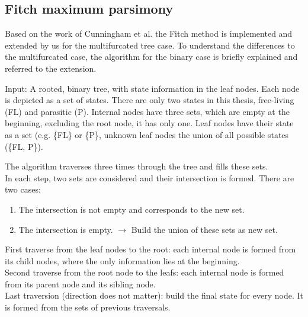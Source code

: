    \subsection{Fitch maximum parsimony}
      Based on the work of Cunningham et al. \cite{Cunningham1998} the Fitch method \cite{Fitch1971} 
        is implemented and extended by us for the multifurcated tree case. To understand the 
        differences to the multifurcated case, the algorithm for the binary case is briefly explained 
        and referred to the extension.

      Input: A rooted, binary tree, with state information in the leaf nodes. Each node is depicted as 
        a set of states. There are only two states in this thesis, free-living (FL) and parasitic (P). 
        Internal nodes have three sets, which are empty at the beginning, excluding the root node, it 
        has only one. Leaf nodes have their state as a set (e.g. \{FL\} or \{P\}, unknown leaf nodes the 
        union of all possible states (\{FL, P\}).

      The algorithm traverses three times through the tree and fills these sets. \\
      In each step, two sets are considered and their intersection is formed. There are two cases:
      \begin{enumerate}
        \item The intersection is not empty and corresponds to the new set.
        \item The intersection is empty. $\rightarrow$ Build the union of these sets as new set.
      \end{enumerate}
      First traverse from the leaf nodes to the root: each internal node is formed from its child nodes, 
        where the only information lies at the beginning. \\
      Second traverse from the root node to the leafs: each internal node is formed from its parent node 
        and its sibling node. \\
      Last traversion (direction does not matter): build the final state for every node. It is formed 
        from the sets of previous traversals.

